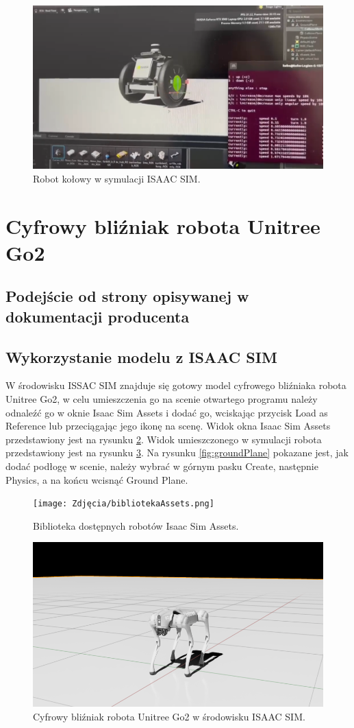 \documentclass[12pt]{article}
\begin{document}
\begin{figure}[h]
    \centering
    \includegraphics[width=0.5\linewidth]{Zdjęcia/robocikRos2.png}
    \caption{Robot kołowy w symulacji ISAAC SIM.}
    \label{fig:robotKolowy}
\end{figure}


\section{Cyfrowy bliźniak robota Unitree Go2}

\subsection{Podejście od strony opisywanej w dokumentacji producenta}

\subsection{Wykorzystanie modelu z ISAAC SIM}
W środowisku ISSAC SIM znajduje się gotowy model cyfrowego bliźniaka robota Unitree Go2, w celu umieszczenia go na scenie otwartego programu należy odnaleźć go w oknie Isaac Sim Assets i dodać go, wciskając przycisk Load as Reference lub przeciągając jego ikonę na scenę. Widok okna Isaac Sim Assets przedstawiony jest na rysunku \ref{fig:Assets}. Widok umieszczonego w symulacji robota przedstawiony jest na rysunku \ref{fig:cyfrowyBlizniak}. Na rysunku \ref{fig:groundPlane} pokazane jest, jak dodać podłogę w scenie, należy wybrać w górnym pasku Create, następnie Physics,  a na końcu wcisnąć Ground Plane.  

\begin{figure}[h]
    \centering
    \texttt{[image: Zdjęcia/bibliotekaAssets.png]}
    \caption{Biblioteka dostępnych robotów Isaac Sim Assets.}
    \label{fig:Assets}
\end{figure}



\begin{figure}[h]
    \centering
    \includegraphics[width=0.75\linewidth]{Zdjęcia/cyfrowyBlizniakUnitryGo2.png}
    \caption{Cyfrowy bliźniak robota Unitree Go2 w środowisku ISAAC SIM.}
    \label{fig:cyfrowyBlizniak}
\end{figure}
\end{document}
